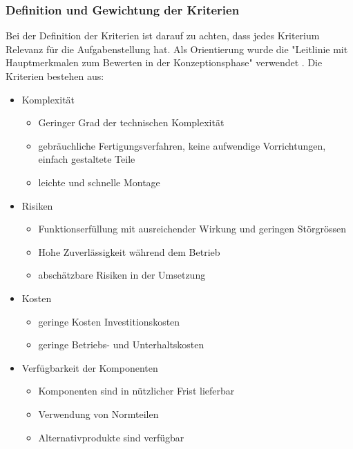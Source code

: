 \subsubsection{Definition und Gewichtung der Kriterien}
Bei der Definition der Kriterien ist darauf zu achten, dass jedes Kriterium Relevanz für die Aufgabenstellung hat. Als Orientierung wurde die "Leitlinie mit Hauptmerkmalen zum Bewerten in der Konzeptionsphase" verwendet \cite{pahl}. 
\newline
Die Kriterien bestehen aus:
\begin{itemize}
	\item Komplexität
	\begin{itemize}
		\item Geringer Grad der technischen Komplexität
		
		\item gebräuchliche Fertigungsverfahren, keine aufwendige Vorrichtungen, einfach gestaltete Teile
		
		\item leichte und schnelle Montage
	\end{itemize}

	\item Risiken
	\begin{itemize}
	\item Funktionserfüllung mit ausreichender Wirkung und geringen Störgrössen
	
	\item Hohe Zuverlässigkeit während dem Betrieb
	
	\item abschätzbare Risiken in der Umsetzung
	\end{itemize}

	\item Kosten
	\begin{itemize}
	\item geringe Kosten Investitionskosten
	
	\item geringe Betriebs- und Unterhaltskosten
	\end{itemize}

	\item Verfügbarkeit der Komponenten
	\begin{itemize}
	\item Komponenten sind in nützlicher Frist lieferbar
	
	\item Verwendung von Normteilen
	
	\item Alternativprodukte sind verfügbar
	\end{itemize}


\end{itemize}
